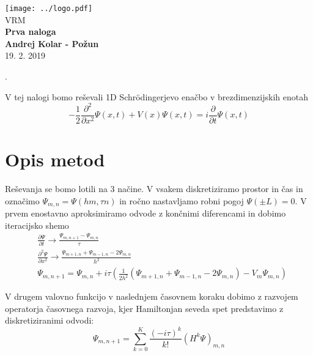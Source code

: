 \documentclass{article}
\begin{document}
\begin{titlepage}
    \begin{center}
        \vspace*{1cm}
        \Large
\texttt{[image: ../logo.pdf]}\\
        \Large
\vspace{1cm}
        VRM\\
        \huge
        \textbf{Prva naloga\\}
\Large  
        \vspace{1cm}
        \textbf{Andrej Kolar - Po{\v z}un\\}
        \vspace{0.8cm}
 19. 2. 2019

\vfill
\normalsize
\end{center}. 
\end{titlepage}
\newpage
{}

V tej nalogi bomo reševali 1D Schrödingerjevo enačbo v brezdimenzijskih enotah
\begin{equation*}
-\frac{1}{2}\frac{\partial^2}{\partial x^2} \Psi(x,t) + V(x) \Psi(x,t) = i \frac{\partial}{\partial t} \Psi(x,t)
\end{equation*}

\section{Opis metod}

Reševanja se bomo lotili na 3 načine.
V vsakem diskretiziramo prostor in čas in označimo $\Psi_{m,n} = \Psi (hm,\tau n)$ in ročno nastavljamo robni pogoj $\Psi(\pm L) = 0$.
V prvem enostavno aproksimiramo odvode z končnimi diferencami in dobimo iteracijsko shemo
\begin{align*}
&\frac{\partial \Psi}{\partial t} \to \frac{\Psi_{m,n+1} - \Psi_{m,n}}{\tau} \\
&\frac{\partial^2 \Psi}{\partial x^2} \to \frac{\Psi_{m+1,n} + \Psi_{m-1,n} - 2 \Psi_{m,n}}{h^2} \\
&\Psi_{m,n+1} = \Psi_{m,n} + i \tau \left( \frac{1}{2h^2}(\Psi_{m+1,n} + \Psi_{m-1,n} - 2\Psi_{m,n}) - V_m \Psi_{m,n} \right)
\end{align*}

V drugem valovno funkcijo v naslednjem časovnem koraku dobimo z razvojem operatorja časovnega razvoja, kjer Hamiltonjan seveda spet predstavimo z diskretiziranimi odvodi:
\begin{equation*}
\Psi_{m,n+1} = \sum_{k=0}^K \frac{(-i\tau)^k}{k!} (H^k \Psi)_{m,n} 
\end{equation*}
\end{document}
